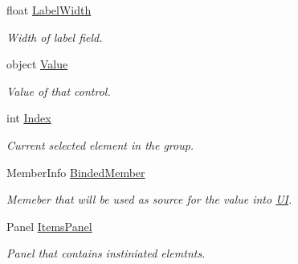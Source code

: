 \begin{DoxyCompactItemize}
float \mbox{\hyperlink{class_wpf_handler_1_1_u_i_1_1_controls_1_1_flat_toggles_group_a183897b270682950d9a7fa6cc8bd7e0f}{Label\+Width}}
\begin{DoxyCompactList}\small\item\em Width of label field. \end{DoxyCompactList}\item 
object \mbox{\hyperlink{class_wpf_handler_1_1_u_i_1_1_controls_1_1_flat_toggles_group_a699f90c459005d9501720e719859ba96}{Value}}
\begin{DoxyCompactList}\small\item\em Value of that control. \end{DoxyCompactList}\item 
int \mbox{\hyperlink{class_wpf_handler_1_1_u_i_1_1_controls_1_1_flat_toggles_group_a89cc073c7cd5761d1700f8d545ae72df}{Index}}
\begin{DoxyCompactList}\small\item\em Current selected element in the group. \end{DoxyCompactList}\item 
Member\+Info \mbox{\hyperlink{class_wpf_handler_1_1_u_i_1_1_controls_1_1_flat_toggles_group_a23b02958e22396a5fb45255cad69eac0}{Binded\+Member}}
\begin{DoxyCompactList}\small\item\em Memeber that will be used as source for the value into \mbox{\hyperlink{namespace_wpf_handler_1_1_u_i}{UI}}. \end{DoxyCompactList}\item 
Panel \mbox{\hyperlink{class_wpf_handler_1_1_u_i_1_1_controls_1_1_flat_toggles_group_a89515b615bad1290bf2342ff791b8f16}{Items\+Panel}}
\begin{DoxyCompactList}\small\item\em Panel that contains instiniated elemtnts. \end{DoxyCompactList}\end{DoxyCompactItemize}
